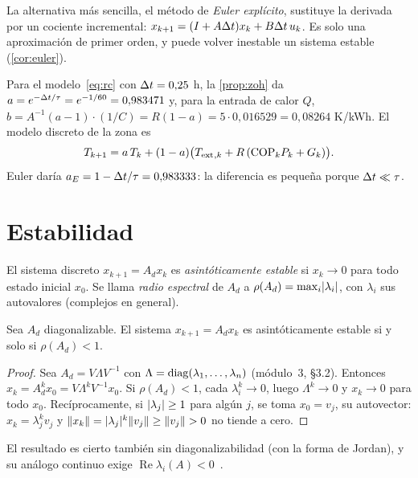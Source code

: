La alternativa más sencilla, el método de \emph{Euler explícito}, sustituye la derivada por un cociente incremental: $x_{k+1}=(I+A\Delta t)x_k+B\Delta t\,u_k$. Es solo una aproximación de primer orden, y puede volver inestable un sistema estable (\cref{cor:euler}).

\begin{ejemplo}\label{ej:zoh}
Para el modelo~\eqref{eq:rc} con $\Delta t=0{,}25$ h, la \cref{prop:zoh} da $a=e^{-\Delta t/\tau}=e^{-1/60}=0{,}983471$ y, para la entrada de calor $Q$, $b=A^{-1}(a-1)\cdot(1/C)=R(1-a)=5\cdot 0{,}016529=0{,}08264$ K/kWh. El modelo discreto de la zona es
\begin{equation}\label{eq:rc-d}
T_{k+1}=a\,T_k+(1-a)\bigl(T_{\mathrm{ext}}{}_{,k}+R\,(\mathrm{COP}_k P_k+G_k)\bigr).
\end{equation}
Euler daría $a_E=1-\Delta t/\tau=0{,}983333$: la diferencia es pequeña porque $\Delta t\ll\tau$.
\end{ejemplo}

\section{Estabilidad}

\begin{definicion}\label{def:estab}
El sistema discreto $x_{k+1}=A_dx_k$ es \emph{asintóticamente estable} si $x_k\to 0$ para todo estado inicial $x_0$. Se llama \emph{radio espectral} de $A_d$ a $\rho(A_d)=\max_i\lvert\lambda_i\rvert$, con $\lambda_i$ sus autovalores (complejos en general).
\end{definicion}

\begin{teorema}\label{teo:estab}
Sea $A_d$ diagonalizable. El sistema $x_{k+1}=A_dx_k$ es asintóticamente estable si y solo si $\rho(A_d)<1$.
\end{teorema}

\begin{proof}
Sea $A_d=V\Lambda V^{-1}$ con $\Lambda=\operatorname{diag}(\lambda_1,\dots,\lambda_n)$ (módulo~3, §3.2). Entonces $x_k=A_d^{k}x_0=V\Lambda^{k}V^{-1}x_0$. Si $\rho(A_d)<1$, cada $\lambda_i^{k}\to0$, luego $\Lambda^{k}\to0$ y $x_k\to0$ para todo $x_0$. Recíprocamente, si $\lvert\lambda_j\rvert\ge1$ para algún $j$, se toma $x_0=v_j$, su autovector: $x_k=\lambda_j^{k}v_j$ y $\lVert x_k\rVert=\lvert\lambda_j\rvert^{k}\lVert v_j\rVert\ge\lVert v_j\rVert>0$ no tiende a cero.
\end{proof}

El resultado es cierto también sin diagonalizabilidad (con la forma de Jordan), y su análogo continuo exige $\operatorname{Re}\lambda_i(A)<0$~\cite[cap.~6]{am}.


